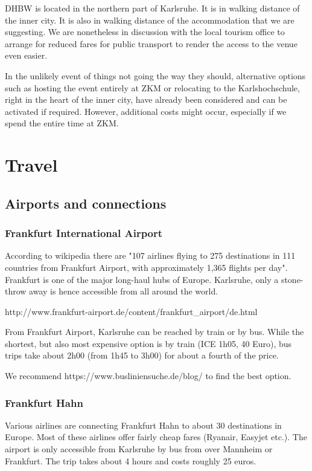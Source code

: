 DHBW is located in the northern part of Karlsruhe. It is in walking distance of the inner city. It is also in walking distance of the accommodation that we are suggesting. We are nonetheless in discussion with the local tourism office to arrange for reduced fares for public transport to render the access to the venue even easier. 

In the unlikely event of things not going the way they should, alternative options such as hosting the event entirely at ZKM or relocating to the Karlshochschule, right in the heart of the inner city, have already been considered and can be activated if required. However, additional costs might occur, especially if we spend the entire time at ZKM. 

\section{Travel}

\subsection{Airports and connections}

\subsubsection{Frankfurt International Airport}

According to wikipedia there are "107 airlines flying to 275 destinations in 111 countries from Frankfurt Airport, with approximately 1,365 flights per day". Frankfurt is one of the major long-haul hubs of Europe. Karlsruhe, only a stone-throw away is hence accessible from all around the world.

http://www.frankfurt-airport.de/content/frankfurt_airport/de.html

From Frankfurt Airport, Karlsruhe can be reached by train or by bus. While the shortest, but also most expensive option is by train (ICE 1h05, 40 Euro), bus trips take about 2h00 (from 1h45 to 3h00) for about a fourth of the price.

We recommend https://www.busliniensuche.de/blog/ to find the best option.

\subsubsection{Frankfurt Hahn}

Various airlines are connecting Frankfurt Hahn to about 30 destinations in Europe. Most of these airlines offer fairly cheap fares (Ryanair, Easyjet etc.). The airport is only accessible from Karlsruhe by bus from over Mannheim or Frankfurt. The trip takes about 4 hours and costs roughly 25 euros.


